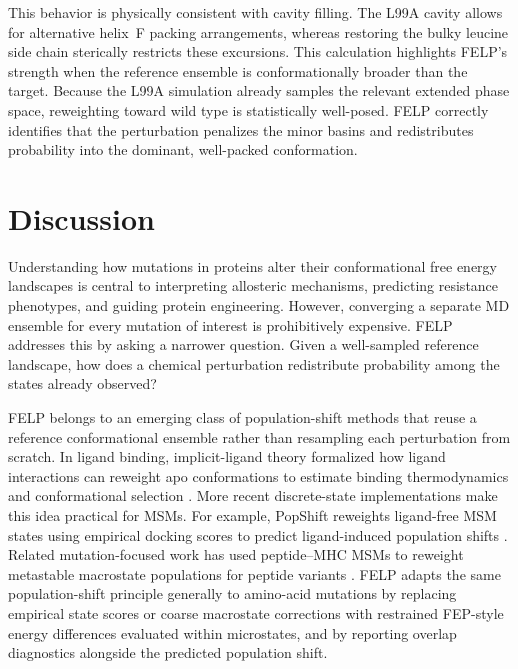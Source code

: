 \documentclass[journal=jctcce,manuscript=article,layout=twocolumn,hyperref=true]{achemso}
\begin{document}
	This behavior is physically consistent with cavity filling. The L99A cavity allows for alternative helix~F packing arrangements, whereas restoring the bulky leucine side chain sterically restricts these excursions. This calculation highlights FELP's strength when the reference ensemble is conformationally broader than the target. Because the L99A simulation already samples the relevant extended phase space, reweighting toward wild type is statistically well-posed. FELP correctly identifies that the perturbation penalizes the minor basins and redistributes probability into the dominant, well-packed conformation.
	
	\section{Discussion}
	
	Understanding how mutations in proteins alter their conformational free energy landscapes is central to interpreting allosteric mechanisms, predicting resistance phenotypes, and guiding protein engineering. However, converging a separate MD ensemble for every mutation of interest is prohibitively expensive. FELP addresses this by asking a narrower question. Given a well-sampled reference landscape, how does a chemical perturbation redistribute probability among the states already observed?
	
	FELP belongs to an emerging class of population-shift methods that reuse a reference conformational ensemble rather than resampling each perturbation from scratch. In ligand binding, implicit-ligand theory formalized how ligand interactions can reweight apo conformations to estimate binding thermodynamics and conformational selection \cite{minh2012implicit,nguyen2018implicit,schutte2015alchemy}. More recent discrete-state implementations make this idea practical for MSMs. For example, PopShift reweights ligand-free MSM states using empirical docking scores to predict ligand-induced population shifts \cite{smith2024popshift}. Related mutation-focused work has used peptide--MHC MSMs to reweight metastable macrostate populations for peptide variants \cite{abella2020msm}. FELP adapts the same population-shift principle generally to amino-acid mutations by replacing empirical state scores or coarse macrostate corrections with restrained FEP-style energy differences evaluated within microstates, and by reporting overlap diagnostics alongside the predicted population shift.
	
\end{document}
